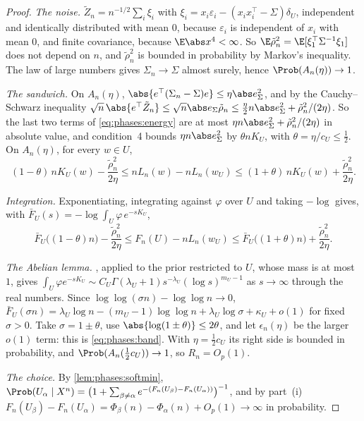 \begin{refsection}
\begin{proof}
\emph{The noise.} $\tilde Z_n=n^{-1/2}\sum_i\xi_i$ with $\xi_i=x_i\varepsilon_i-(x_ix_i^\top-\Sigma)\delta_U$, independent and identically distributed with mean $0$, because $\varepsilon_i$ is independent of $x_i$ with mean $0$, and finite covariance, because $\E\abs x^4<\infty$. So $\E\tilde\rho_n^2=\E[\xi_1^\top\Sigma^{-1}\xi_1]$ does not depend on $n$, and $\tilde\rho_n^2$ is bounded in probability by Markov's inequality. The law of large numbers gives $\Sigma_n\to\Sigma$ almost surely, hence $\Prob(A_n(\eta))\to1$.

\emph{The sandwich.} On $A_n(\eta)$, $\abs{e^\top(\Sigma_n-\Sigma)e}\le\eta\abs e_\Sigma^2$, and by the Cauchy--Schwarz inequality $\sqrt n\,\abs{e^\top\tilde Z_n}\le\sqrt n\abs e_\Sigma\tilde\rho_n\le\frac\eta2n\abs e_\Sigma^2+\tilde\rho_n^2/(2\eta)$. So the last two terms of \eqref{eq:phases:energy} are at most $\eta n\abs e_\Sigma^2+\tilde\rho_n^2/(2\eta)$ in absolute value, and condition~4 bounds $\eta n\abs e_\Sigma^2$ by $\theta nK_U$, with $\theta=\eta/c_U\le\frac12$. On $A_n(\eta)$, for every $w\in U$,
\[
(1-\theta)\,nK_U(w)-\frac{\tilde\rho_n^2}{2\eta}\le nL_n(w)-nL_n(w_U)\le(1+\theta)\,nK_U(w)+\frac{\tilde\rho_n^2}{2\eta}.
\]

\emph{Integration.} Exponentiating, integrating against $\varphi$ over $U$ and taking $-\log$ gives, with $\bar F_U(s)=-\log\int_U\varphi\,e^{-sK_U}$,
\[
\bar F_U\bigl((1-\theta)n\bigr)-\frac{\tilde\rho_n^2}{2\eta}\le F_n(U)-nL_n(w_U)\le\bar F_U\bigl((1+\theta)n\bigr)+\frac{\tilde\rho_n^2}{2\eta}.
\]

\emph{The Abelian lemma.} , applied to the prior restricted to $U$, whose mass is at most $1$, gives $\int_U\varphi e^{-sK_U}\sim C_U\Gamma(\lambda_U+1)s^{-\lambda_U}(\log s)^{m_U-1}$ as $s\to\infty$ through the real numbers. Since $\log\log(\sigma n)-\log\log n\to0$, $\bar F_U(\sigma n)=\lambda_U\log n-(m_U-1)\log\log n+\lambda_U\log\sigma+\kappa_U+o(1)$ for fixed $\sigma>0$. Take $\sigma=1\pm\theta$, use $\abs{\log(1\pm\theta)}\le2\theta$, and let $\epsilon_n(\eta)$ be the larger $o(1)$ term: this is \eqref{eq:phases:band}. With $\eta=\frac12c_U$ its right side is bounded in probability, and $\Prob(A_n(\frac12c_U))\to1$, so $R_n=O_p(1)$.

\emph{The choice.} By \cref{lem:phases:softmin}, $\Prob(U_\alpha\mid X^n)=\bigl(1+\sum_{\beta\ne\alpha}e^{-(F_n(U_\beta)-F_n(U_\alpha))}\bigr)^{-1}$, and by part~(i) $F_n(U_\beta)-F_n(U_\alpha)=\Phi_\beta(n)-\Phi_\alpha(n)+O_p(1)\to\infty$ in probability.
\end{proof}


\end{refsection}
